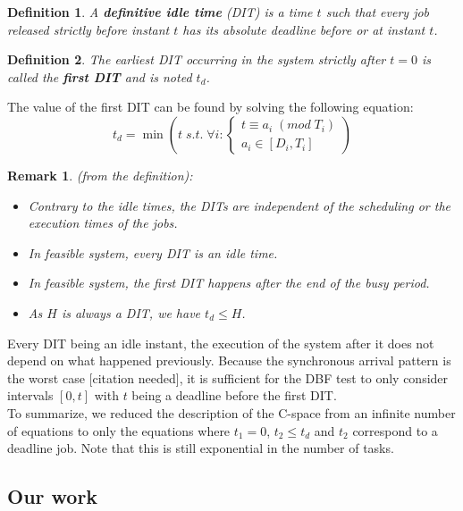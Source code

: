\documentclass[times, 10pt,twocolumn, a4paper]{article}
\newtheorem{definition}{Definition}
\newtheorem{remark}{Remark}
\begin{document}
\begin{definition}
A \textbf{definitive idle time} (DIT) is a time $t$ such that every job released strictly before instant $t$ has its absolute deadline before or at instant $t$.
\end{definition}

\begin{definition}
The earliest DIT occurring in the system strictly after $t=0$ is called the \textbf{first DIT} and is noted $t_d$.
\end{definition}

The value of the first DIT can be found by solving the following equation:
\[
  t_d = \min \left( t \; s.t. \; \forall i:
  \left\{
  \begin{array}{c}
    t \equiv a_i \; (mod \; T_i) \\
    a_i \in [D_i, T_i]
  \end{array}
  \right.
  \right)
\]

\begin{remark} (from the definition):
 \begin{itemize}
  \item Contrary to the idle times, the DITs are independent of the scheduling or the execution times of the jobs.
  \item In feasible system, every DIT is an idle time.
  \item In feasible system, the first DIT happens after the end of the busy period.
  \item As $H$ is always a DIT, we have $t_d \leq H$.
 \end{itemize}
\end{remark}

Every DIT being an idle instant, the execution of the system after it does not depend on what happened previously. Because the synchronous arrival pattern is the worst case [citation needed], it is sufficient for the DBF test to only consider intervals $[0, t]$ with $t$ being a deadline before the first DIT.\\

To summarize, we reduced the description of the C-space from an infinite number of equations to only the equations where $t_1 = 0$, $t_2 \leq t_d$ and $t_2$ correspond to a deadline job. Note that this is still exponential in the number of tasks.

  \subsection{Our work}
\end{document}
